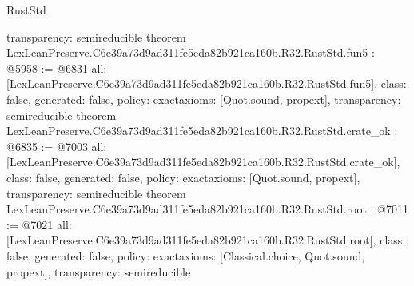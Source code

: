 \begin{lexlean}{RustStd}
\begin{coremodule}
{  transparency: semireducible
}
theorem LexLeanPreserve.C6e39a73d9ad311fe5eda82b921ca160b.R32.RustStd.fun5 : @5958 := @6831 {
  all: [LexLeanPreserve.C6e39a73d9ad311fe5eda82b921ca160b.R32.RustStd.fun5],
  class: false,
  generated: false,
  policy: exact{axioms: [Quot.sound, propext]},
  transparency: semireducible
}
theorem LexLeanPreserve.C6e39a73d9ad311fe5eda82b921ca160b.R32.RustStd.crate_ok : @6835 := @7003 {
  all: [LexLeanPreserve.C6e39a73d9ad311fe5eda82b921ca160b.R32.RustStd.crate_ok],
  class: false,
  generated: false,
  policy: exact{axioms: [Quot.sound, propext]},
  transparency: semireducible
}
theorem LexLeanPreserve.C6e39a73d9ad311fe5eda82b921ca160b.R32.RustStd.root : @7011 := @7021 {
  all: [LexLeanPreserve.C6e39a73d9ad311fe5eda82b921ca160b.R32.RustStd.root],
  class: false,
  generated: false,
  policy: exact{axioms: [Classical.choice, Quot.sound, propext]},
  transparency: semireducible
}


\end{coremodule}
\end{lexlean}
